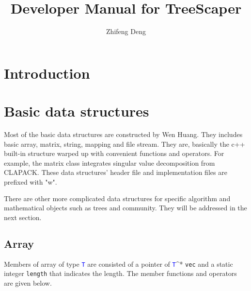 \documentclass[11pt,a4paper]{article}
\title{Developer Manual for TreeScaper}
\author{Zhifeng Deng}
\newcommand{\ttype}[1]{\textcolor{blue}{\texttt{#1}}}
\theoremstyle{definition}
\theoremstyle{definition}
\numberwithin{equation}{section}
\begin{document}
	\maketitle
	
	\tableofcontent
	
	\section{Introduction}
	
	\section{Basic data structures}
	
	Most of the basic data structures are constructed by Wen Huang. They includes basic array, matrix, string, mapping and file stream. They are, basically the c++ built-in structure warped up with convenient functions and operators. For example, the matrix class integrates singular value decomposition from CLAPACK. These data structures' header file and implementation files are prefixed with "w".
	
	There are other more complicated data structures for specific algorithm and mathematical objects such as trees and community. They will be addressed in the next section. 
	
	\subsection{Array}
	
	Members of array of type \ttype{T} are consisted of a pointer of \ttype{T}^* \texttt{vec} and a static integer \texttt{length} that indicates the length. The member functions and operators are given below.
	
\end{document}
